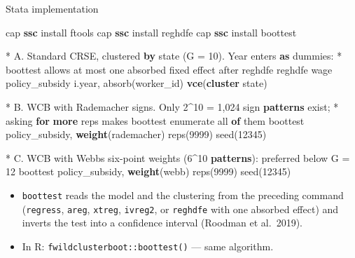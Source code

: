 \documentclass[
  11pt,
  ignorenonframetext,
  aspectratio=169,
]{beamer}
\newenvironment{Shaded}{\begin{snugshade}}{\end{snugshade}}
\newcommand{\DecValTok}[1]{\textcolor[rgb]{0.68,0.00,0.00}{#1}}
\newcommand{\FunctionTok}[1]{\textcolor[rgb]{0.28,0.35,0.67}{#1}}
\newcommand{\KeywordTok}[1]{\textcolor[rgb]{0.00,0.23,0.31}{\textbf{#1}}}
\newcommand{\NormalTok}[1]{\textcolor[rgb]{0.00,0.23,0.31}{#1}}
\newcommand{\OtherTok}[1]{\textcolor[rgb]{0.00,0.23,0.31}{#1}}
\providecommand{\tightlist}{%
  \setlength{\itemsep}{0pt}\setlength{\parskip}{0pt}}
\begin{document}
\begin{frame}[fragile]{Stata implementation}
\protect{}\label{stata-implementation}
\scriptsize

\begin{Shaded}
\begin{Highlighting}[]
\NormalTok{cap }\KeywordTok{ssc}\NormalTok{ install ftools}
\NormalTok{cap }\KeywordTok{ssc}\NormalTok{ install reghdfe}
\NormalTok{cap }\KeywordTok{ssc}\NormalTok{ install boottest}

\NormalTok{* A. Standard CRSE, clustered }\KeywordTok{by}\NormalTok{ state (G = 10). Year enters }\KeywordTok{as}\NormalTok{ dummies:}
\NormalTok{*    boottest allows }\FunctionTok{at}\NormalTok{ most one absorbed fixed effect after reghdfe}
\NormalTok{reghdfe wage policy\_subsidy i.}\FunctionTok{year}\NormalTok{, absorb(worker\_id) }\KeywordTok{vce}\NormalTok{(}\KeywordTok{cluster}\NormalTok{ state)}

\NormalTok{* B. WCB with Rademacher signs. Only 2\^{}10 = 1,024 }\FunctionTok{sign} \KeywordTok{patterns}\NormalTok{ exist;}
\NormalTok{*    asking }\KeywordTok{for} \KeywordTok{more}\NormalTok{ reps makes boottest enumerate }\OtherTok{all} \KeywordTok{of}\NormalTok{ them}
\NormalTok{boottest policy\_subsidy, }\KeywordTok{weight}\NormalTok{(rademacher) reps(9999) }\DecValTok{seed}\NormalTok{(12345)}

\NormalTok{* C. WCB with Webb\textquotesingle{}s six{-}point weights (6\^{}10 }\KeywordTok{patterns}\NormalTok{): preferred below G = 12}
\NormalTok{boottest policy\_subsidy, }\KeywordTok{weight}\NormalTok{(webb) reps(9999) }\DecValTok{seed}\NormalTok{(12345)}
\end{Highlighting}
\end{Shaded}

\normalsize

\begin{itemize}
\tightlist
\item
  \texttt{boottest} reads the model and the clustering from the
  preceding command (\texttt{regress}, \texttt{areg}, \texttt{xtreg},
  \texttt{ivreg2}, or \texttt{reghdfe} with one absorbed effect) and
  inverts the test into a confidence interval (Roodman et al.~2019).
\item
  In R: \texttt{fwildclusterboot::boottest()} --- same algorithm.
\end{itemize}
\end{frame}
\end{document}
